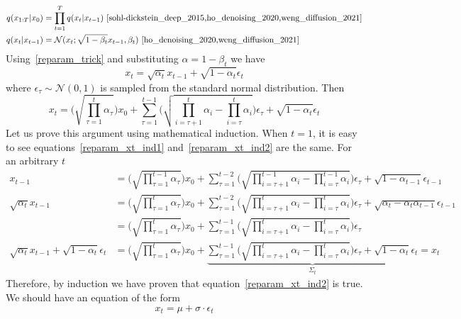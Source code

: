 \documentclass{book}
\numberwithin{equation}{subsection}
\begin{document}
\begin{align}
    q(x_{1:T}|x_0) &= \prod_{t=1}^T q(x_t|x_{t-1})~\cite{sohl-dickstein_deep_2015,ho_denoising_2020,weng_diffusion_2021}\\
    q(x_t|x_{t-1}) &= \mathcal{N}(x_t; \sqrt{1-\beta_t}x_{t-1}, \beta_t)~\cite{ho_denoising_2020,weng_diffusion_2021}
\end{align}
Using~\ref{reparam_trick} and substituting $\alpha = 1-\beta_t$ we have
\begin{equation}
    x_t = \sqrt{\alpha_t}x_{t-1}+\sqrt{1-\alpha_t}\epsilon_t\label{reparam_xt_ind1}
\end{equation}
where $\epsilon_\tau \sim \mathcal{N}(0, 1)$ is sampled from the standard normal distribution. Then
\begin{equation}
    x_t = \Big(\sqrt{\prod_{\tau=1}^{t}\alpha_\tau}\Big)x_0+\sum_{\tau=1}^{t-1}\Big(\sqrt{\prod_{i=\tau+1}^{t}\alpha_i-\prod_{i=\tau}^{t}\alpha_i}\Big)\epsilon_\tau+\sqrt{1-\alpha_t}\epsilon_t\label{reparam_xt_ind2}
\end{equation}
Let us prove this argument using mathematical induction. When $t=1$, it is easy to see equations~\ref{reparam_xt_ind1} and~\ref{reparam_xt_ind2} are the same. For an arbitrary $t$
\begin{align}
    x_{t-1} &= \Big(\sqrt{\prod_{\tau=1}^{t-1}\alpha_\tau}\Big)x_0+\sum_{\tau=1}^{t-2}\Big(\sqrt{\prod_{i=\tau+1}^{t-1}\alpha_i-\prod_{i=\tau}^{t-1}\alpha_i}\Big)\epsilon_\tau+\sqrt{1-\alpha_{t-1}}\epsilon_{t-1}\\
    \sqrt{\alpha_t}x_{t-1} &= \Big(\sqrt{\prod_{\tau=1}^{t}\alpha_\tau}\Big)x_0+\sum_{\tau=1}^{t-2}\Big(\sqrt{\prod_{i=\tau+1}^{t}\alpha_i-\prod_{i=\tau}^{t}\alpha_i}\Big)\epsilon_\tau+\sqrt{\alpha_t-\alpha_t\alpha_{t-1}}\epsilon_{t-1}\\
     &= \Big(\sqrt{\prod_{\tau=1}^{t}\alpha_\tau}\Big)x_0+\sum_{\tau=1}^{t-1}\Big(\sqrt{\prod_{i=\tau+1}^{t}\alpha_i-\prod_{i=\tau}^{t}\alpha_i}\Big)\epsilon_\tau\\
     \sqrt{\alpha_t}x_{t-1}+\sqrt{1-\alpha_t}\epsilon_t&= \Big(\sqrt{\prod_{\tau=1}^{t}\alpha_\tau}\Big)x_0+\underbrace{\sum_{\tau=1}^{t-1}\Big(\sqrt{\prod_{i=\tau+1}^{t}\alpha_i-\prod_{i=\tau}^{t}\alpha_i}\Big)\epsilon_\tau+\sqrt{1-\alpha_t}\epsilon_t}_{\Sigma_t} = x_t
\end{align}
Therefore, by induction we have proven that equation~\ref{reparam_xt_ind2} is true.
We should have an equation of the form
\begin{equation}
    x_t = \mu + \sigma \cdot \epsilon_t
\end{equation}
\end{document}
